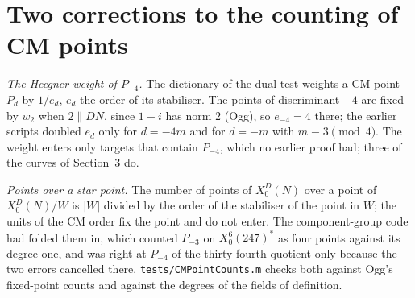 \documentclass[11pt,reqno]{amsart}
\theoremstyle{plain}
\theoremstyle{definition}
\begin{document}
\section{Two corrections to the counting of CM points}

\emph{The Heegner weight of $P_{-4}$.} The dictionary of the dual test weights a CM point $P_d$ by $1/e_d$, $e_d$
the order of its stabiliser. The points of discriminant $-4$ are fixed by $w_2$ when $2\parallel DN$, since
$1+i$ has norm $2$ (Ogg), so $e_{-4}=4$ there; the earlier scripts doubled $e_d$ only for $d=-4m$ and for $d=-m$
with $m\equiv3\pmod 4$. The weight enters only targets that contain $P_{-4}$, which no earlier proof had; three
of the curves of Section~3 do.

\emph{Points over a star point.} The number of points of $X_0^D(N)$ over a point of $X_0^D(N)/W$ is $|W|$ divided
by the order of the stabiliser of the point in $W$; the units of the CM order fix the point and do not enter.
The component-group code had folded them in, which counted $P_{-3}$ on $X_0^6(247)^*$ as four points against its
degree one, and was right at $P_{-4}$ of the thirty-fourth quotient only because the two errors cancelled there.
\texttt{tests/CMPointCounts.m} checks both against Ogg's fixed-point counts and against the degrees of the fields
of definition.
\end{document}
